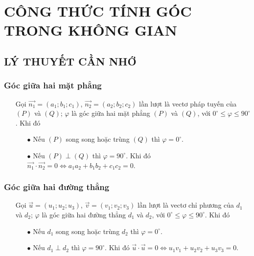 \setcounter{dang}{0}
\newpage
\section{CÔNG THỨC TÍNH GÓC TRONG KHÔNG GIAN}
\subsection{LÝ THUYẾT CẦN NHỚ}
\subsubsection{Góc giữa hai mặt phẳng}
\begin{itemize}
	\item [\iconMT]  Gọi $\vec{n_1}=(a_1;b_1;c_1)$, $\vec{n_2}=(a_2;b_2;c_2)$ lần lượt là vectơ pháp tuyến của $(P)$ và $(Q)$; $\varphi$ là góc giữa hai mặt phẳng $(P)$ và $(Q)$, với $0^\circ \leq \varphi \leq 90^\circ$.
	Khi đó
	\item [\iconMT] 
	\begin{itemize}
		\item [$\bullet$] Nếu $(P)$ song song hoặc trùng $(Q)$ thì $\varphi =0^\circ$.
		\item [$\bullet$] Nếu $(P)\perp (Q)$ thì $\varphi =90^\circ$. Khi đó $\vec{n_1}\cdot \vec{n_2}=0 \Leftrightarrow a_1a_2+b_1b_2+c_1c_2=0$.
	\end{itemize}
\end{itemize}
\subsubsection{Góc giữa hai đường thẳng}
\begin{itemize}
	\item [\iconMT]   Gọi $\vec{u}=(u_1;u_2;u_3)$, $\vec{v}=(v_1;v_2;v_3)$ lần lượt là vectơ chỉ phương của  $d_1$ và $d_2$; $\varphi$ là góc giữa hai đường thẳng $d_1$ và $d_2$, với $0^\circ \leq \varphi \leq 90^\circ$.
	Khi đó
	\item [\iconMT] 
	\begin{itemize}
		\item [$\bullet$] Nếu $d_1$ song song hoặc trùng $d_2$ thì $\varphi =0^\circ$.
		\item [$\bullet$] Nếu $d_1\perp d_2$ thì $\varphi =90^\circ$. Khi đó $\vec{u} \cdot\vec{u} =0 \Leftrightarrow u_1v_1+u_2v_2+u_3v_3=0$.
	\end{itemize}
\end{itemize}

